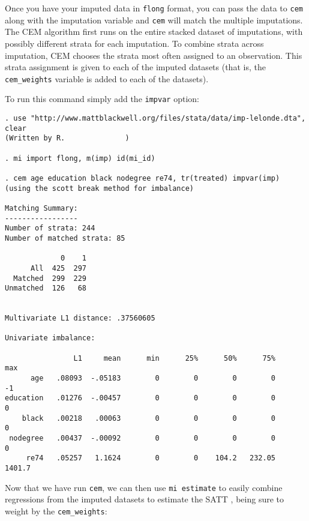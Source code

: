 \documentclass[11pt]{article}
\begin{document}
Once you have your imputed data in \texttt{flong} format, you can pass
the data to \texttt{cem} along with the imputation variable and
\texttt{cem} will match the multiple imputations. The CEM algorithm
first runs on the entire stacked dataset of imputations, with possibly
different strata for each imputation. To combine strata across
imputation, CEM chooses the strata most often assigned to an
observation. This strata assignment is given to each of the imputed
datasets (that is, the \texttt{cem\_weights} variable is added to each
of the datasets).

To run this command simply add the \texttt{impvar} option:

\begin{verbatim}
. use "http://www.mattblackwell.org/files/stata/data/imp-lelonde.dta", clear
(Written by R.              )

. mi import flong, m(imp) id(mi_id)

. cem age education black nodegree re74, tr(treated) impvar(imp)
(using the scott break method for imbalance)

Matching Summary:
-----------------
Number of strata: 244
Number of matched strata: 85

             0    1
      All  425  297
  Matched  299  229
Unmatched  126   68


Multivariate L1 distance: .37560605

Univariate imbalance:

                L1     mean      min      25%      50%      75%      max
      age   .08093  -.05183        0        0        0        0       -1
education   .01276  -.00457        0        0        0        0        0
    black   .00218   .00063        0        0        0        0        0
 nodegree   .00437  -.00092        0        0        0        0        0
     re74   .05257   1.1624        0        0    104.2   232.05   1401.7
\end{verbatim}
Now that we have run \texttt{cem}, we can then use \texttt{mi
  estimate} to easily combine regressions from the imputed datasets to
estimate the SATT \citep{KinHonJos01}, being sure to weight by the
\texttt{cem\_weights}:
\end{document}
